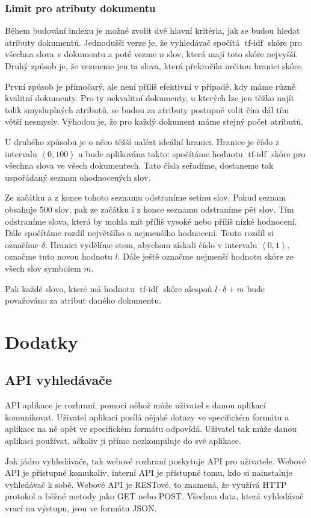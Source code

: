 \documentclass[12pt]{article}
\newcommand{\ssection}[1]{\subsection{#1}}
\newcommand{\sssection}[1]{\subsubsection{#1}}
\newcommand{\addsp}[1]{\left<#1\right>}
\DeclareMathOperator{\tfidf}{tf-idf}
\begin{document}
\sssection{Limit pro atributy dokumentu}
Během budování indexu je možné zvolit dvě hlavní kritéria, jak se budou hledat atributy dokumentů. Jednodušší verze je, že vyhledávač spočítá $\tfidf$ skóre pro všechna slova v dokumentu a poté vezme $n$ slov, která mají toto skóre nejvyšší. Druhý způsob je, že vezmeme jen ta slova, která překročila určitou hranici skóre. 

První způsob je přímočarý, ale není příliš efektivní v případě, kdy máme různě kvalitní dokumenty. Pro ty nekvalitní dokumenty, u kterých lze jen těžko najít tolik smysluplných atributů, se budou za atributy postupně volit čím dál tím větší nesmysly. Výhodou je, že pro každý dokument máme stejný počet atributů.

U druhého způsobu je o něco těžší nalézt ideální hranici. Hranice je číslo z intervalu $\addsp{0, 100}$ a bude aplikována takto: spočítáme hodnotu $\tfidf$ skóre pro všechna slova ve všech dokumentech. Tato čísla seřadíme, dostaneme tak uspořádaný seznam ohodnocených slov. 

Ze začátku a z konce tohoto seznamu odstraníme setinu slov. Pokud seznam obsahuje 500 slov, pak ze začátku i z konce seznamu odstraníme pět slov. Tím odstraníme slova, která by mohla mít příliš vysoké nebo příliš nízké hodnocení. Dále spočítáme rozdíl největšího a nejmenšího hodnocení. Tento rozdíl si označíme $\delta$. Hranici vydělíme stem, abychom získali číslo v intervalu $\addsp{0, 1}$, označme tuto novou hodnotu $l$. Dále ještě označme nejmenší hodnotu skóre ze všech slov symbolem $m$. 

Pak každé slovo, které má hodnotu $\tfidf$ skóre alespoň $l\cdot\delta+m$ bude považováno za atribut daného dokumentu. 




\section{Dodatky}

\ssection{API vyhledávače}

API aplikace je rozhraní, pomocí něhož může uživatel s danou aplikací komunikovat. Uživatel aplikaci posílá nějaké dotazy ve specifickém formátu a aplikace na ně opět ve specifickém formátu odpovídá. Uživatel tak může danou aplikaci používat, ačkoliv ji přímo nezkompiluje do své aplikace.  

Jak jádro vyhledávače, tak webové rozhraní poskytuje API pro uživatele. Webové API je přístupné komukoliv, interní API je přístupné tomu, kdo si nainstaluje vyhledávač k sobě. Webové API je RESTové, to znamená, že využívá HTTP protokol a běžné metody jako GET nebo POST. Všechna data, která vyhledávač vrací na výstupu, jsou ve formátu JSON. 
\end{document}
